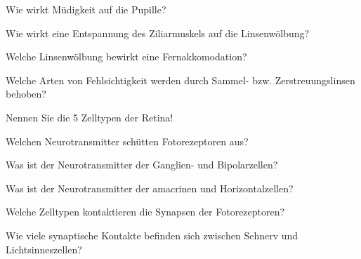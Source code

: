 \documentclass[10pt, a4paper]{exam}
\begin{document}
\begin{questions}
\begin{solution}
  \end{solution}

  \question Wie wirkt Müdigkeit auf die Pupille?
  \begin{solution}

  \end{solution}

  \question Wie wirkt eine Entspannung des Ziliarmuskels auf die Linsenwölbung?
  \begin{solution}

  \end{solution}

  \question Welche Linsenwölbung bewirkt eine Fernakkomodation?
  \begin{solution}

  \end{solution}

  \question Welche Arten von Fehlsichtigkeit werden durch Sammel- bzw. Zerstreuungslinsen behoben?
  \begin{solution}

  \end{solution}

  \question Nennen Sie die 5 Zelltypen der Retina!
  \begin{solution}

  \end{solution}

  \question Welchen Neurotransmitter schütten Fotorezeptoren aus?
  \begin{solution}

  \end{solution}

  \question Was ist der Neurotransmitter der Ganglien- und Bipolarzellen?
  \begin{solution}

  \end{solution}

  \question Was ist der Neurotransmitter der amacrinen und Horizontalzellen?
  \begin{solution}

  \end{solution}

  \question Welche Zelltypen kontaktieren die Synapsen der Fotorezeptoren?
  \begin{solution}

  \end{solution}

  \question Wie viele synaptische Kontakte befinden sich zwischen Sehnerv und Lichtsinneszellen?
  \begin{solution}


\end{solution}
\end{questions}
\end{document}
